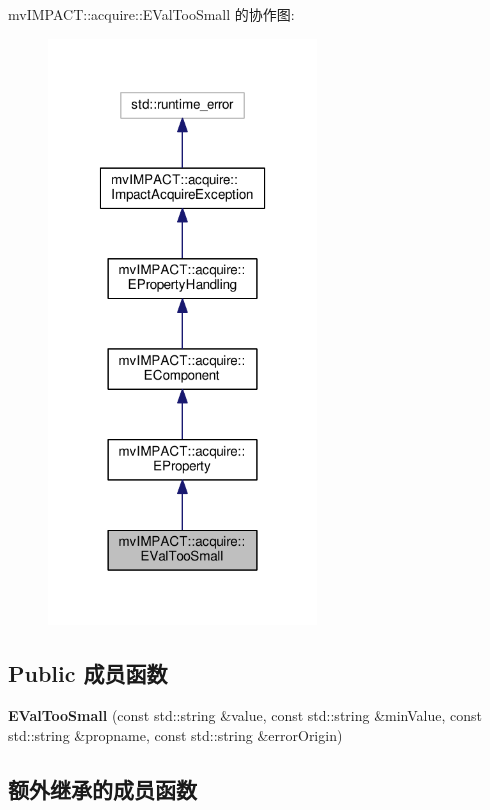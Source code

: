 mv\+I\+M\+P\+A\+C\+T\+:\+:acquire\+:\+:E\+Val\+Too\+Small 的协作图\+:
\nopagebreak
\begin{figure}[H]
\begin{center}
\leavevmode
\includegraphics[width=202pt]{classmv_i_m_p_a_c_t_1_1acquire_1_1_e_val_too_small__coll__graph}
\end{center}
\end{figure}
\subsection*{Public 成员函数}
\begin{DoxyCompactItemize}
\item 
\hypertarget{classmv_i_m_p_a_c_t_1_1acquire_1_1_e_val_too_small_a27ae5fb2190cea67c118a6290a2c8018}{{\bfseries E\+Val\+Too\+Small} (const std\+::string \&value, const std\+::string \&min\+Value, const std\+::string \&propname, const std\+::string \&error\+Origin)}\label{classmv_i_m_p_a_c_t_1_1acquire_1_1_e_val_too_small_a27ae5fb2190cea67c118a6290a2c8018}

\end{DoxyCompactItemize}
\subsection*{额外继承的成员函数}


